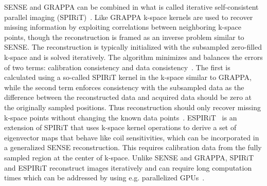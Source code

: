 SENSE and GRAPPA can be combined in what is called iterative self-consistent parallel imaging (SPIRiT)~\cite{SPIRiT}. Like GRAPPA k-space kernels are used to recover missing information by exploiting correlations between neighboring k-space points, though the reconstruction is framed as an inverse problem similar to SENSE. 
The reconstruction is typically initialized with the subsampled zero-filled k-space and is solved iteratively. The algorithm minimizes and balances the errors of two terms: calibration consistency and data consistency~\cite{AdvancesPI}. The first is calculated using a so-called SPIRiT kernel in the k-space similar to GRAPPA, while the second term enforces consistency with the subsampled data as the difference between the reconstructed data and acquired data should be zero at the originally sampled positions. Thus reconstruction should only recover missing k-space points without changing the known data points~\cite{AdvancesPI}. ESPIRiT~\cite{ESPIRiT} is an extension of SPIRiT that uses k-space kernel operations to derive a set of eigenvector maps that behave like coil sensitivities, which can be incorporated in a generalized SENSE reconstruction. This requires calibration data from the fully sampled region at the center of k-space. Unlike SENSE and GRAPPA, SPIRiT and ESPIRiT reconstruct images iteratively and can require long computation times which can be addressed by using e.g. parallelized GPUs~\cite{AdvancesPI}.

